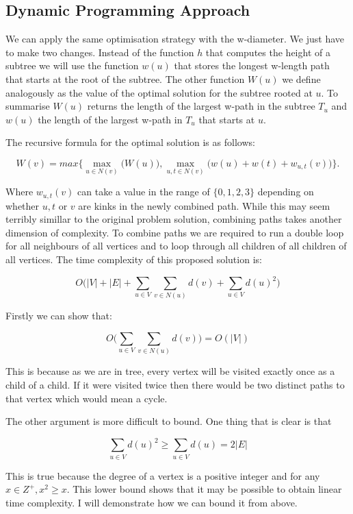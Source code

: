 \subsection{Dynamic Programming Approach}

We can apply the same optimisation strategy with the w-diameter. We just have to make two changes. Instead of the function $h$ that computes the height of a subtree we will use the function $w(u)$ that stores the longest w-length path that starts at the root of the subtree. The other function $W(u)$ we define analogously as the value of the optimal solution for the subtree rooted at $u$. To summarise $W(u)$ returns the length of the largest w-path in the subtree $T_u$ and $w(u)$ the length of the largest w-path in $T_u$ that starts at $u$.

The recursive formula for the optimal solution is as follows:

$$ W(v) = max\bigg\{ \max\limits_{u \in N(v)}\bigg(W(u)\bigg), \max\limits_{u, t \in N(v)}\bigg(w(u) + w(t) + w_{u, t}(v)\bigg) \bigg\}. $$

Where $w_{u, t}(v)$ can take a value in the range of $\{0, 1, 2, 3\}$ depending on whether $u, t \text{ or } v$ are kinks in the newly combined path. While this may seem terribly simillar to the original problem solution, combining paths takes another dimension of complexity. To combine paths we are required to run a double loop for all neighbours of all vertices and to loop through all children of all children of all vertices. The time complexity of this proposed solution is:

$$ O\bigg( |V| + |E| + \sum_{u \in V}{\sum_{v \in N(u)}{d(v)}} + \sum_{u \in V}{d(u)^2}  \bigg) $$

Firstly we can show that:

$$ O\bigg( \sum_{u \in V}{\sum_{v \in N(u)}{d(v)}} \bigg) = O(|V|) $$

This is because as we are in tree, every vertex will be visited exactly once as a child of a child. If it were visited twice then there would be two distinct paths to that vertex which would mean a cycle. 

The other argument is more difficult to bound. One thing that is clear is that 

$$ \sum_{u \in V}{d(u)^2} \ge \sum_{u \in V}{d(u)} = 2|E|$$

This is true because the degree of a vertex is a positive integer and for any $x \in Z^+, x^2 \ge x$. This lower bound shows that it may be possible to obtain linear time complexity. I will demonstrate how we can bound it from above. 

